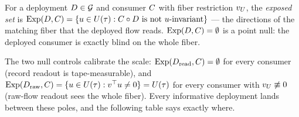 \begin{definition}
\label{def:exposed}
For a deployment $D \in \mathcal{G}$ and consumer $C$ with fiber restriction
$v_{U}$, the \emph{exposed set} is
$\operatorname{Exp}(D, C) = \{u \in U(\tau) : C \circ D \text{ is not } u\text{-invariant}\}$
--- the directions of the matching fiber that the deployed flow reads.
$\operatorname{Exp}(D, C) = \emptyset$ is a point null: the deployed consumer is
exactly blind on the whole fiber.
\end{definition}

The two null controls calibrate the scale:
$\operatorname{Exp}(D_{\mathrm{read}}, C) = \emptyset$ for every consumer (record readout is
tape-measurable), and $\operatorname{Exp}(D_{\mathrm{raw}}, C) = \{u \in U(\tau) : v^{\top}u \ne
0\} = U(\tau)$ for every consumer with $v_{U} \not\equiv 0$ (raw-flow readout
sees the whole fiber). Every informative deployment lands between these
poles, and the following table says exactly where.


